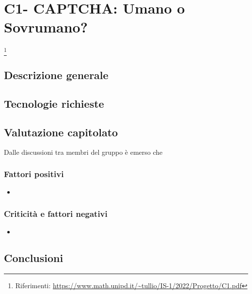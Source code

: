 
\renewcommand{\capName}{CAPTCHA: Umano o Sovrumano?} %
\renewcommand{\capCode}{C1} %
\renewcommand{\capLink}{https://www.math.unipd.it/~tullio/IS-1/2022/Progetto/C1.pdf} %
\renewcommand{\capProposer}{Zucchetti} %


\section{\capCode - \capName} \footnote{Riferimenti: \url{\capLink}}
\subsection{Descrizione generale}

\subsection{Tecnologie richieste}

\subsection{Valutazione capitolato}
Dalle discussioni tra membri del gruppo è emerso che

\subsubsection{Fattori positivi}

\begin{itemize}
    \item 
\end{itemize}

\subsubsection{Criticità e fattori negativi}

\begin{itemize}
    \item 
\end{itemize}

\subsection{Conclusioni}